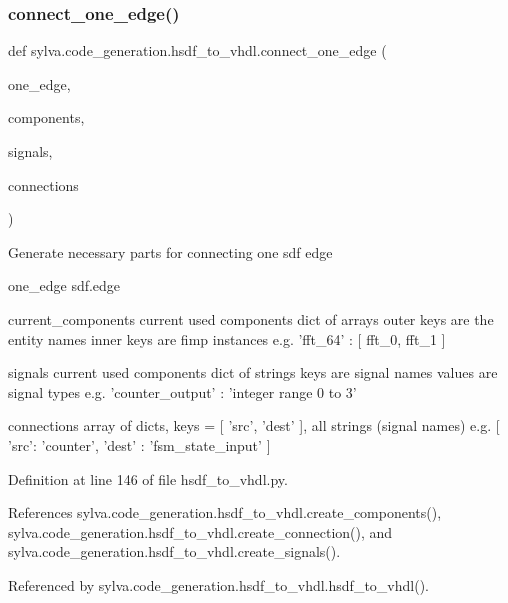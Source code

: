 \subsubsection{\texorpdfstring{connect\+\_\+one\+\_\+edge()}{connect\_one\_edge()}}
{\footnotesize\ttfamily def sylva.\+code\+\_\+generation.\+hsdf\+\_\+to\+\_\+vhdl.\+connect\+\_\+one\+\_\+edge (\begin{DoxyParamCaption}\item[{}]{one\+\_\+edge,  }\item[{}]{components,  }\item[{}]{signals,  }\item[{}]{connections }\end{DoxyParamCaption})}

\begin{DoxyVerb}Generate necessary parts for connecting one sdf edge

  one_edge
    sdf.edge

  current_components
    current used components
    dict of arrays
    outer keys are the entity names
    inner keys are fimp instances
    e.g. { 'fft_64' : [ fft_0, fft_1 ] }

  signals
    current used components
    dict of strings
    keys are signal names
    values are signal types
    e.g. { 'counter_output' : 'integer range 0 to 3' }

  connections
    array of dicts, keys = [ 'src', 'dest' ], all strings (signal names)
    e.g. [ { 'src': 'counter', 'dest' : 'fsm_state_input' } ]
\end{DoxyVerb}
 

Definition at line 146 of file hsdf\+\_\+to\+\_\+vhdl.\+py.



References sylva.\+code\+\_\+generation.\+hsdf\+\_\+to\+\_\+vhdl.\+create\+\_\+components(), sylva.\+code\+\_\+generation.\+hsdf\+\_\+to\+\_\+vhdl.\+create\+\_\+connection(), and sylva.\+code\+\_\+generation.\+hsdf\+\_\+to\+\_\+vhdl.\+create\+\_\+signals().



Referenced by sylva.\+code\+\_\+generation.\+hsdf\+\_\+to\+\_\+vhdl.\+hsdf\+\_\+to\+\_\+vhdl().


